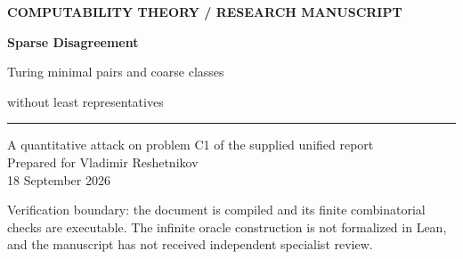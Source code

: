\documentclass[11pt,a4paper]{article}
\newcommand{\leT}{\leq_{\mathrm T}}
\theoremstyle{definition}\newtheorem{definition}[theorem]{Definition}
\theoremstyle{remark}\newtheorem{remark}[theorem]{Remark}
\begin{document}
\hypersetup{pageanchor=false}
\begin{titlepage}
\vspace*{10mm}
{\small\sffamily\bfseries\color{navy}COMPUTABILITY THEORY \quad / \quad RESEARCH MANUSCRIPT\par}
\vspace{14mm}
{\Huge\bfseries\color{navy}Sparse Disagreement\par}
\vspace{5mm}
{\LARGE Turing minimal pairs and coarse classes\par without least representatives\par}
\vspace{12mm}
\noindent\rule{\textwidth}{0.5pt}
\vspace{4mm}
\noindent A quantitative attack on problem C1 of the supplied unified report\\[4pt]
Prepared for Vladimir Reshetnikov\\
18 September 2026
\vspace{9mm}
\begin{abstract}
We give a finite-extension construction of two binary sets $A,B\leT Z''$ that are individually $1$-generic relative to an arbitrary oracle $Z$, form a Turing minimal pair over $Z$, and disagree below $n$ at most $b(n)$ times, for any prescribed computable nondecreasing unbounded integer function $b$. In particular, $b(n)=\lfloor\log_2(n+1)\rfloor$ makes $A$ and $B$ coarsely equal. For $Z=\emptyset$, their common uniform and nonuniform coarse classes have no least Turing degree. The essential lemma uses a one-disagreement reserve and connectivity of finite Boolean cubes: absent a finite disagreement between two oracle computations, dense convergence forces their common total output to be computable in $Z$.

We also identify the Turing spectrum of a coarse class with the spectrum of its actual coarse descriptions, and realize every Turing degree as an \emph{unattained infimum} of such a spectrum. An independent literature check is important: the negative answer to the literal least-degree question already follows from Hirschfeldt--Jockusch--Kuyper--Schupp (2016). Accordingly, no priority claim is made for that answer. The quantitative minimal-pair construction and its consequences are presented with full conventional proofs; their novelty is not established by the search conducted here.
\end{abstract}
\vfill
\noindent\small\color{ink}Verification boundary: the document is compiled and its finite combinatorial checks are executable. The infinite oracle construction is not formalized in Lean, and the manuscript has not received independent specialist review.
\end{titlepage}
\hypersetup{pageanchor=true}
{\small\tableofcontents}
\clearpage
{}
\end{document}
